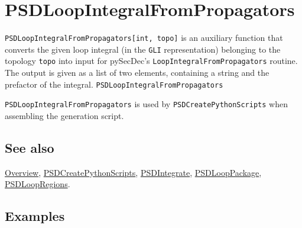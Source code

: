 \documentclass[../FeynHelpersManual.tex]{subfiles}
\begin{document}
\hypertarget{psdloopintegralfrompropagators}{
\section{PSDLoopIntegralFromPropagators}\label{psdloopintegralfrompropagators}}

\texttt{PSDLoopIntegralFromPropagators[\allowbreak{}int,\ \allowbreak{}topo]}
is an auxiliary function that converts the given loop integral (in the
\texttt{GLI} representation) belonging to the topology \texttt{topo}
into input for pySecDec's \texttt{LoopIntegralFromPropagators} routine.
The output is given as a list of two elements, containing a string and
the prefactor of the integral. \texttt{PSDLoopIntegralFromPropagators}

\texttt{PSDLoopIntegralFromPropagators} is used by
\texttt{PSDCreatePythonScripts} when assembling the generation script.

\subsection{See also}

\hyperlink{toc}{Overview},
\hyperlink{psdcreatepythonscripts}{PSDCreatePythonScripts},
\hyperlink{psdintegrate}{PSDIntegrate},
\hyperlink{psdlooppackage}{PSDLoopPackage},
\hyperlink{psdloopregions}{PSDLoopRegions}.

\subsection{Examples}

\begin{Shaded}
\begin{Highlighting}[]
\ExtensionTok{=}\OperatorTok{[}\OperatorTok{,} \OperatorTok{\{}\OperatorTok{[\{}\OperatorTok{,} \SpecialCharTok{\^{}}\OperatorTok{\}],}\OperatorTok{[}\OperatorTok{],}\OperatorTok{[\{}\OperatorTok{,} \SpecialCharTok{\^{}}\OperatorTok{\}],}\OperatorTok{[} \SpecialCharTok{{-}}\SpecialCharTok{{-}}\SpecialCharTok{{-}}\OperatorTok{],}\OperatorTok{[} \SpecialCharTok{{-}}\SpecialCharTok{{-}}\OperatorTok{],}\OperatorTok{[} \SpecialCharTok{{-}}\OperatorTok{],}\OperatorTok{[} \SpecialCharTok{{-}}\OperatorTok{],}\OperatorTok{[}\SpecialCharTok{+}\OperatorTok{],}\OperatorTok{[}\SpecialCharTok{+}\OperatorTok{]\},} \OperatorTok{\{}\OperatorTok{,}\OperatorTok{,}\OperatorTok{\},} \OperatorTok{\{}\OperatorTok{\},} \OperatorTok{\{\},} \OperatorTok{\{\}]}
\end{Highlighting}
\end{Shaded}
\end{document}
